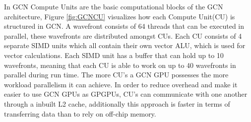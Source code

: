 
In GCN Compute Units are the basic computational blocks of the GCN architecture, Figure \ref{fig:GCNCU} visualizes how each Compute Unit(CU) is structured in GCN.
A wavefront consists of 64 threads that can be executed in parallel, these wavefronts are distributed amongst CUs. 
Each CU consists of 4 separate SIMD units which all contain their own vector ALU, which is used for vector calculations.  
Each SIMD unit has a buffer that can hold up to 10 wavefronts, meaning that each CU is able to work on up to 40 wavefronts in parallel during run time. 
The more CU’s a GCN \gls{GPU} possesses the more workload parallelism it can achieve.
In order to reduce overhead and make it easier to use GCN \glspl{GPU} as \glspl{GPGPU}, CU’s can communicate with one another through a inbuilt  L2 cache, additionally this approach is faster in terms of transferring data than to rely on off-chip memory.





